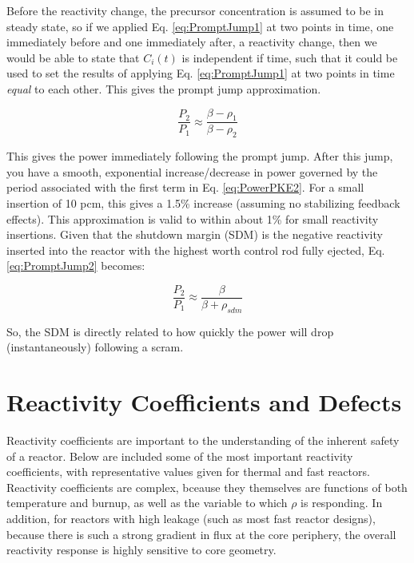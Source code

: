 \documentclass[10pt]{article}
\begin{document}
\begin{flushleft}
Before the reactivity change, the precursor concentration is assumed to be in steady state, so if we applied Eq. \ref{eq:PromptJump1} at two points in time, one immediately before and one immediately after, a reactivity change, then we would be able to state that \(C_i(t)\) is independent if time, such that it could be used to set the results of applying Eq. \ref{eq:PromptJump1} at two points in time \textit{equal} to each other. This gives the prompt jump approximation.

\begin{equation}
\label{eq:PromptJump2}
\frac{P_2}{P_1}\approx\frac{\beta-\rho_1}{\beta-\rho_2}
\end{equation} 

This gives the power immediately following the prompt jump. After this jump, you have a smooth, exponential increase/decrease in power governed by the period associated with the first term in Eq. \ref{eq:PowerPKE2}. For a small insertion of 10 pcm, this gives a 1.5\% increase (assuming no stabilizing feedback effects). This approximation is valid to within about 1\% for small reactivity insertions. Given that the shutdown margin (SDM) is the negative reactivity inserted into the reactor with the highest worth control rod fully ejected, Eq. \ref{eq:PromptJump2} becomes:

\begin{equation}
\label{eq:PromptJumpSDM}
\frac{P_2}{P_1}\approx\frac{\beta}{\beta+\rho_{sdm}}
\end{equation} 

So, the SDM is directly related to how quickly the power will drop (instantaneously) following a scram.









\section{Reactivity Coefficients and Defects}

Reactivity coefficients are important to the understanding of the inherent safety of a reactor. Below are included some of the most important reactivity coefficients, with representative values given for thermal and fast reactors. Reactivity coefficients are complex, bceause they themselves are functions of both temperature and burnup, as well as the variable to which \(\rho\) is responding. In addition, for reactors with high leakage (such as most fast reactor designs), because there is such a strong gradient in flux at the core periphery, the overall reactivity response is highly sensitive to core geometry.


\end{flushleft}
\end{document}
